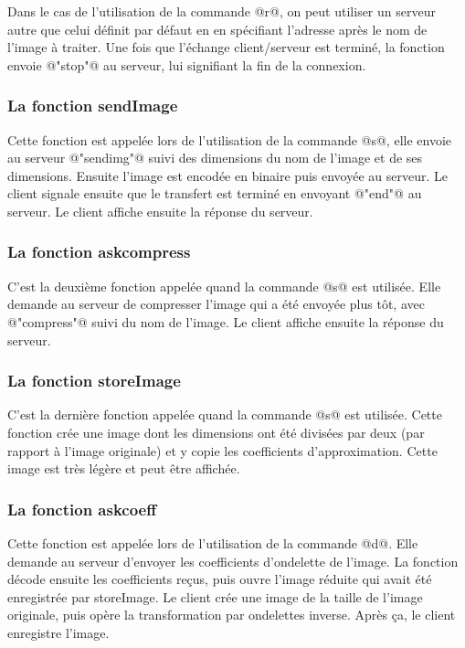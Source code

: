 \documentclass{article}
\begin{document}
Dans le cas de l'utilisation de la commande @r@, on peut utiliser un serveur autre que celui définit par défaut en en spécifiant l'adresse après le nom de l'image à traiter. Une fois que l'échange client/serveur est terminé, la fonction envoie @"stop"@ au serveur, lui signifiant la fin de la connexion.

\subsubsection{La fonction sendImage}

Cette fonction est appelée lors de l'utilisation de la commande @s@, elle envoie au serveur @"sendimg"@ suivi des dimensions du nom de l'image et de ses dimensions. Ensuite l'image est encodée en binaire puis envoyée au serveur. Le client signale ensuite que le transfert est terminé en envoyant @"end"@ au serveur. Le client affiche ensuite la réponse du serveur.

\subsubsection{La fonction askcompress}

C'est la deuxième fonction appelée quand la commande @s@ est utilisée. Elle demande au serveur de compresser l'image qui a été envoyée plus tôt, avec @"compress"@ suivi du nom de l'image. Le client affiche ensuite la réponse du serveur.

\subsubsection{La fonction storeImage}

C'est la dernière fonction appelée quand la commande @s@ est utilisée. Cette fonction crée une image dont les dimensions ont été divisées par deux (par rapport à l'image originale) et y copie les coefficients d'approximation. Cette image est très légère et peut être affichée.

\subsubsection{La fonction askcoeff}

Cette fonction est appelée lors de l'utilisation de la commande @d@. Elle demande au serveur d'envoyer les coefficients d'ondelette de l'image. La fonction décode ensuite les coefficients reçus, puis ouvre l'image réduite qui avait été enregistrée par storeImage. Le client crée une image de la taille de l'image originale, puis opère la transformation par ondelettes inverse. Après ça, le client enregistre l'image.
\end{document}
